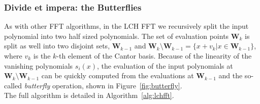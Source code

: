     \begin{algorithm2e}[H]
        \caption{Basis conversion from monomial to \emph{novelpoly}}
        \label{alg:basiscvt}

    \end{algorithm2e}

    \subsubsection{Divide et impera: the Butterflies}
    As with other FFT algorithms, in the LCH FFT we recursively split the input polynomial into two half sized polynomials. The set of evaluation 
    points $\mathbf{W}_k$ is split as well into two disjoint sets, $\mathbf{W}_{k-1}$ and $\mathbf{W}_k\setminus \mathbf{W}_{k-1} = \{x + v_k | x \in \mathbf{W}_{k-1}\}$,
    where $v_k$ is the $k$-th element of the Cantor basis. Because of the linearity of the vanishing polynomials $s_i(x)$, 
    the evaluation of the input polynomials at $\mathbf{W}_k\setminus \mathbf{W}_{k-1}$ can be quickly computed from the 
    evaluations at $\mathbf{W}_{k-1}$ and the so-called \emph{butterfly} operation, shown in Figure~\ref{fig:butterfly}.\\
    The full algorithm is detailed in Algorithm~\ref{alg:lchfft}.

